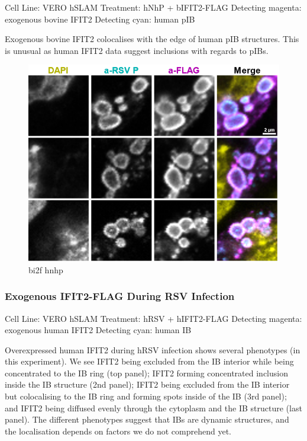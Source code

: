 Cell Line: VERO hSLAM \newline
Treatment: hNhP + bIFIT2-FLAG \newline
Detecting magenta: exogenous bovine IFIT2 \newline
Detecting cyan: human pIB \newline

Exogenous bovine IFIT2 colocalises with the edge of human pIB structures. This is unusual as human IFIT2 data suggest inclusions with regards to pIBs.

\begin{figure}
    \centering
    \includegraphics[width=1\linewidth]{10. Chapter 5/Figs/03. IFIT2-FLAG/05. bi2f bnbp.png}
    \caption[bi2f hnhp]{bi2f hnhp}
    \label{bi2f hnhp}
\end{figure}

\subsubsection{Exogenous IFIT2-FLAG During RSV Infection} \label{Exogenous IFIT2-FLAG During RSV Infection}
Cell Line: VERO hSLAM \newline
Treatment: hRSV + hIFIT2-FLAG \newline
Detecting magenta: exogenous human IFIT2 \newline
Detecting cyan: human IB \newline

Overexpressed human IFIT2 during hRSV infection shows several phenotypes (in this experiment). We see IFIT2 being excluded from the IB interior while being concentrated to the IB ring (top panel); IFIT2 forming concentrated inclusion inside the IB structure (2nd panel); IFIT2 being excluded from the IB interior but colocalising to the IB ring and forming spots inside of the IB (3rd panel); and IFIT2 being diffused evenly through the cytoplasm and the IB structure (last panel). The different phenotypes suggest that IBs are dynamic structures, and the localisation depends on factors we do not comprehend yet. 

